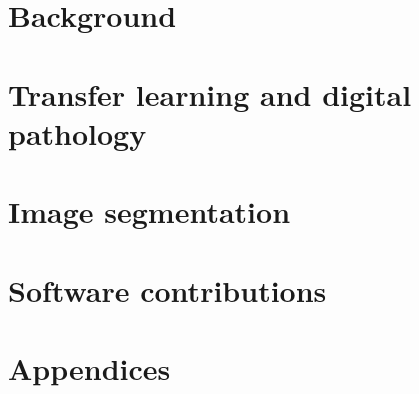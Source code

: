 % 
\pagestyle{empty}



\frontmatter






\mainmatter
\pagestyle{scrheadings}



\part{Background}
\label{part:background}



\part{Transfer learning and digital pathology}
\label{part:transfer}



\part{Image segmentation}
\label{part:segmentation}


\part{Software contributions}
\label{part:software}


\appendix
\part{Appendices}




\backmatter
\listoffigures
\listoftables

\printbibliography





